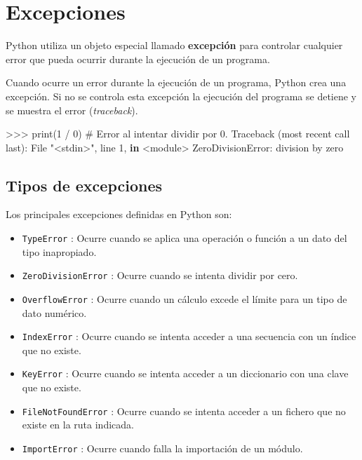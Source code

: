 \documentclass[
  spanish,
  a4paper,
]{scrreport}
\newenvironment{Shaded}{\begin{snugshade}}{\end{snugshade}}
\newcommand{\BuiltInTok}[1]{\textcolor[rgb]{0.00,0.23,0.31}{#1}}
\newcommand{\CommentTok}[1]{\textcolor[rgb]{0.37,0.37,0.37}{#1}}
\newcommand{\DecValTok}[1]{\textcolor[rgb]{0.68,0.00,0.00}{#1}}
\newcommand{\KeywordTok}[1]{\textcolor[rgb]{0.00,0.23,0.31}{\textbf{#1}}}
\newcommand{\NormalTok}[1]{\textcolor[rgb]{0.00,0.23,0.31}{#1}}
\newcommand{\OperatorTok}[1]{\textcolor[rgb]{0.37,0.37,0.37}{#1}}
\newcommand{\PreprocessorTok}[1]{\textcolor[rgb]{0.68,0.00,0.00}{#1}}
\newcommand{\StringTok}[1]{\textcolor[rgb]{0.13,0.47,0.30}{#1}}
\providecommand{\tightlist}{%
  \setlength{\itemsep}{0pt}\setlength{\parskip}{0pt}}
\begin{document}

\chapter{Excepciones}\label{excepciones}

Python utiliza un objeto especial llamado \textbf{excepción} para
controlar cualquier error que pueda ocurrir durante la ejecución de un
programa.

Cuando ocurre un error durante la ejecución de un programa, Python crea
una excepción. Si no se controla esta excepción la ejecución del
programa se detiene y se muestra el error (\emph{traceback}).

\begin{Shaded}
\begin{Highlighting}[]
\OperatorTok{\textgreater{}\textgreater{}\textgreater{}} \BuiltInTok{print}\NormalTok{(}\DecValTok{1} \OperatorTok{/} \DecValTok{0}\NormalTok{)  }\CommentTok{\# Error al intentar dividir por 0.}
\NormalTok{Traceback (most recent call last):}
\NormalTok{  File }\StringTok{"\textless{}stdin\textgreater{}"}\NormalTok{, line }\DecValTok{1}\NormalTok{, }\KeywordTok{in} \OperatorTok{\textless{}}\NormalTok{module}\OperatorTok{\textgreater{}}
\PreprocessorTok{ZeroDivisionError}\NormalTok{: division by zero}
\end{Highlighting}
\end{Shaded}

\section{Tipos de excepciones}\label{tipos-de-excepciones}

Los principales excepciones definidas en Python son:

\begin{itemize}
\tightlist
\item
  \texttt{TypeError} : Ocurre cuando se aplica una operación o función a
  un dato del tipo inapropiado.
\item
  \texttt{ZeroDivisionError} : Ocurre cuando se intenta dividir por
  cero.
\item
  \texttt{OverflowError} : Ocurre cuando un cálculo excede el límite
  para un tipo de dato numérico.
\item
  \texttt{IndexError} : Ocurre cuando se intenta acceder a una secuencia
  con un índice que no existe.
\item
  \texttt{KeyError} : Ocurre cuando se intenta acceder a un diccionario
  con una clave que no existe.
\item
  \texttt{FileNotFoundError} : Ocurre cuando se intenta acceder a un
  fichero que no existe en la ruta indicada.
\item
  \texttt{ImportError} : Ocurre cuando falla la importación de un
  módulo.
\end{itemize}
\end{document}
